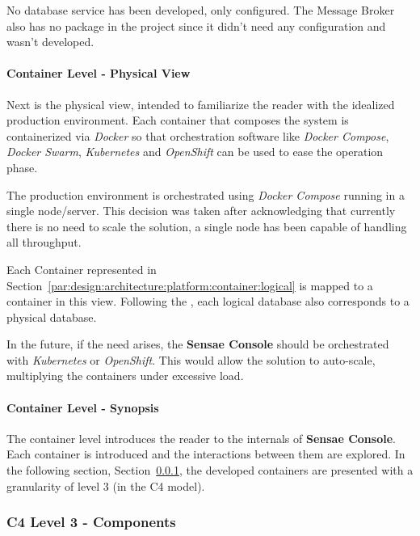 No database service has been developed, only configured. The Message Broker also has no package in the project since it didn't need any configuration and wasn't developed.

\paragraph{Container Level - Physical View}
\label{par:design:architecture:platform:container:physical}

Next is the physical view, intended to familiarize the reader with the idealized production environment. Each container that composes the system is containerized via \textit{Docker} so that orchestration software like \textit{Docker Compose}, \textit{Docker Swarm}, \textit{Kubernetes} and \textit{OpenShift} can be used to ease the operation phase.

The production environment is orchestrated using \textit{Docker Compose} running in a single node/server. This decision was taken after acknowledging that currently there is no need to scale the solution, a single node has been capable of handling all throughput.

Each Container represented in Section~\ref{par:design:architecture:platform:container:logical} is mapped to a container in this view. Following the , each logical database also corresponds to a physical database.

In the future, if the need arises, the \textbf{Sensae Console} should be orchestrated with \textit{Kubernetes} or \textit{OpenShift}. This would allow the solution to auto-scale, multiplying the containers under excessive load.

\paragraph{Container Level - Synopsis}
\label{par:design:architecture:platform:container:synopsis}

The container level introduces the reader to the internals of \textbf{Sensae Console}. Each container is introduced and the interactions between them are explored.
In the following section, Section~\ref{subsubsec:design:architecture:platform:components}, the developed containers are presented with a granularity of level 3 (in the C4 model).

\subsubsection{C4 Level 3 - Components}
\label{subsubsec:design:architecture:platform:components}

